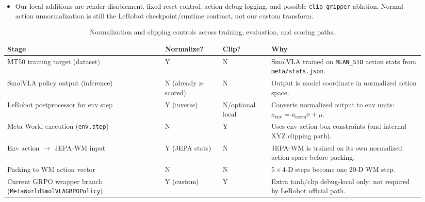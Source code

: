 \documentclass{article}
\begin{document}
\begin{itemize}
\begin{itemize}
    \item Our local additions are render disablement, fixed-reset control, action-debug logging, and possible \texttt{clip\_gripper} ablation.  Normal action unnormalization is still the LeRobot checkpoint/runtime contract, not our custom transform.
  \end{itemize}
  \begin{table}[t]
  \centering
  \small
  \begin{tabular}{p{4.2cm} p{2.0cm} p{1.6cm} p{4.8cm}}
    \toprule
    \textbf{Stage} & \textbf{Normalize?} & \textbf{Clip?} & \textbf{Why}
    \\
    \midrule
    MT50 training target (dataset) & Y & N & SmolVLA trained on \texttt{MEAN\_STD} action stats from \texttt{meta/stats.json}. \\
    SmolVLA policy output (inference) & N (already z-scored) & N & Output is model coordinate in normalized action space. \\
    LeRobot postprocessor for env step & Y (inverse) & N/optional local & Converts normalized output to env units: \(a_{\mathrm{env}}=a_{\mathrm{norm}}\sigma+\mu\). \\
    Meta-World execution (\texttt{env.step}) & N & Y & Uses env action-box constraints (and internal XYZ clipping path). \\
    Env action \(\rightarrow\) JEPA-WM input & Y (JEPA stats) & N & JEPA-WM is trained on its own normalized action space before packing. \\
    Packing to WM action vector & N & N & \(5\times4\)-D steps become one \(20\)-D WM step. \\
    Current GRPO wrapper branch (\texttt{MetaWorldSmolVLAGRPOPolicy}) & Y (custom) & Y & Extra tanh/clip debug-local only; not required by LeRobot official path. \\
    \bottomrule
  \end{tabular}
  \caption{Normalization and clipping controls across training, evaluation, and scoring paths.}
  \label{tab:normalization-clipping-audit}
  \end{table}
\end{itemize}













\end{document}
